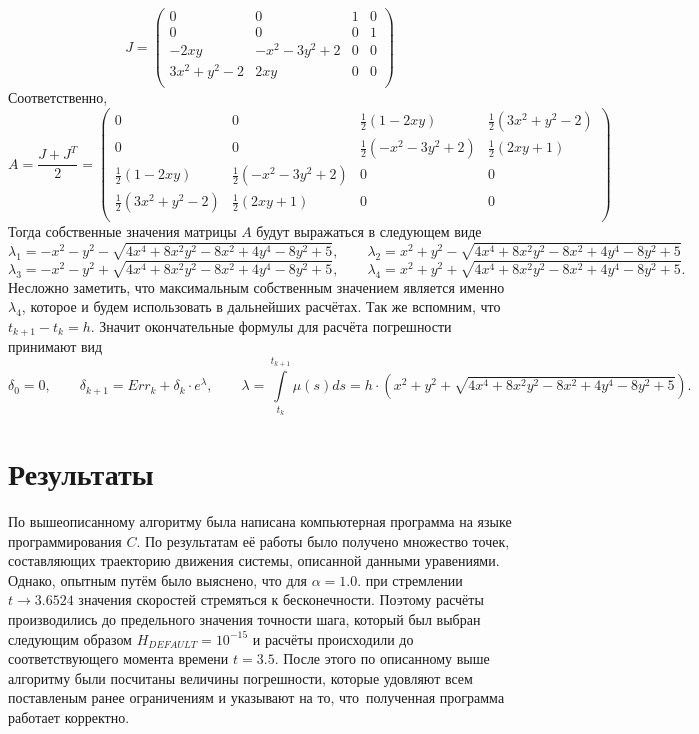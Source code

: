 \documentclass[a4paper,14pt]{article}
\begin{document}
\[
J =
\left(
\begin{array}{cccc}
 0 & 0 & 1 & 0 \\
 0 & 0 & 0 & 1 \\
 -2 x y & -x^2-3 y^2+2 & 0 & 0 \\
 3 x^2+y^2-2 & 2 x y & 0 & 0 \\
\end{array}
\right)
\]
Соответственно, 
\[
A = \frac{J + J^T}{2} = 
\left(
\begin{array}{cccc}
 0 & 0 & \frac{1}{2} (1-2 x y) & \frac{1}{2} \left(3 x^2+y^2-2\right) \\
 0 & 0 & \frac{1}{2} \left(-x^2-3 y^2+2\right) & \frac{1}{2} (2 x y+1) \\
 \frac{1}{2} (1-2 x y) & \frac{1}{2} \left(-x^2-3 y^2+2\right) & 0 & 0 \\
 \frac{1}{2} \left(3 x^2+y^2-2\right) & \frac{1}{2} (2 x y+1) & 0 & 0 \\
\end{array}
\right)
\]
Тогда собственные значения матрицы $A$ будут выражаться в следующем виде
\[
\lambda_1 = -x^2-y^2-\sqrt{4 x^4+8 x^2 y^2-8 x^2+4 y^4-8 y^2+5}, \qquad \lambda_2 = x^2+y^2-\sqrt{4 x^4+8 x^2 y^2-8 x^2+4 y^4-8 y^2+5}
\]
\[
\lambda_3 =-x^2-y^2+\sqrt{4 x^4+8 x^2 y^2-8 x^2+4 y^4-8 y^2+5}, \qquad \lambda_4 = x^2+y^2 +\sqrt{4 x^4+8 x^2 y^2-8 x^2+4 y^4-8 y^2+5}.
\]
Несложно заметить, что максимальным собственным значением является именно $\lambda_4$, которое и будем использовать в дальнейших расчётах. Так же вспомним, что $ t_{k+1} - t_k = h$. Значит окончательные формулы для расчёта погрешности принимают вид
\[
\delta_0 = 0, \qquad\delta_{k+1} = Err_{k} + \delta_{k} \cdot e^{\lambda}, \qquad \lambda = \int\limits_{t_k}^{t_{k+1}} \mu(s) ds = h \cdot \left(x^2+y^2 +\sqrt{4 x^4+8 x^2 y^2-8 x^2+4 y^4-8 y^2+5} \right).
\]

\section{Результаты}
По вышеописанному алгоритму была написана компьютерная программа на языке программирования $C$. По результатам её работы было получено множество точек, составляющих траекторию движения системы, описанной данными уравениями.
Однако, опытным путём было выяснено, что для $\alpha = 1.0$. при стремлении $t \to 3.6524$ значения скоростей стремяться к бесконечности. Поэтому расчёты производились до предельного значения точности шага, который был выбран следующим образом $H_{DEFAULT} = 10^{-15}$ и расчёты происходили до соответствующего момента времени $t = 3.5$. После этого по описанному выше алгоритму были посчитаны величины погрешности, которые удовляют всем поставленым ранее ограничениям и указывают на то, что~полученная программа работает корректно.
\end{document}
